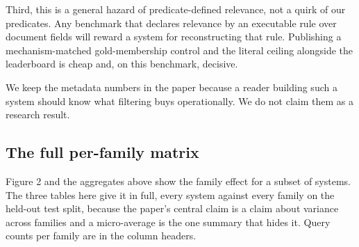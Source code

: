 \documentclass[acmsmall]{acmart}
\begin{document}
Third, this is a general hazard of predicate-defined relevance, not a quirk of our predicates. Any benchmark that declares relevance by an executable rule over document fields will reward a system for reconstructing that rule. Publishing a mechanism-matched gold-membership control and the literal ceiling alongside the leaderboard is cheap and, on this benchmark, decisive.

We keep the metadata numbers in the paper because a reader building such a system should know what filtering buys operationally. We do not claim them as a research result.


\subsection{The full per-family matrix}
Figure 2 and the aggregates above show the family effect for a subset of systems. The three tables here give it in full, every system against every family on the held-out test split, because the paper's central claim is a claim about variance across families and a micro-average is the one summary that hides it. Query counts per family are in the column headers.


\begin{table}[t]
\centering
\small
\caption{Table 6: nDCG@10 by question family, text-only systems, test split. Column headers carry the number of test queries in each family.}
\end{table}
\end{document}
